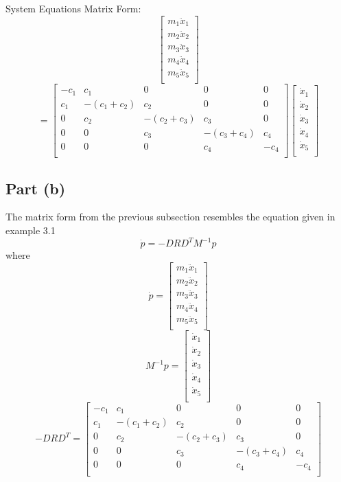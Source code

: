 \documentclass[conference]{IEEEtran}
\begin{document}
System Equations Matrix Form:
\[
\begin{bmatrix}
    m_1\ddot x_1\\
    m_2\ddot x_2\\
    m_3\ddot x_3\\
    m_4\ddot x_4\\
    m_5\ddot x_5\\
\end{bmatrix}
\]
\[
=
\begin{bmatrix}
    -c_1 & c_1 & 0 & 0 & 0\\
    c_1 & -(c_1+c_2) & c_2 & 0 & 0\\
    0 & c_2 & -(c_2+c_3) & c_3 & 0\\
    0 & 0 & c_3 & -(c_3+c_4) & c_4\\
    0 & 0 & 0 & c_4 & -c_4\\
\end{bmatrix}
\begin{bmatrix}
    \dot x_1\\
    \dot x_2\\
    \dot x_3\\
    \dot x_4\\
    \dot x_5\\
\end{bmatrix}
\]
\subsection{Part (b)}
The matrix form from the previous subsection resembles the equation given in example 3.1
\[\dot p = -DR{D^T}{M^{-1}}p\]
where 
\[\dot p = 
\begin{bmatrix}
    m_1\ddot x_1\\
    m_2\ddot x_2\\
    m_3\ddot x_3\\
    m_4\ddot x_4\\
    m_5\ddot x_5\\
\end{bmatrix}
\]
\[M^{-1}p = 
\begin{bmatrix}
    \dot x_1\\
    \dot x_2\\
    \dot x_3\\
    \dot x_4\\
    \dot x_5\\
\end{bmatrix}
\]
\[ -DR{D^T} = 
\begin{bmatrix}
    -c_1 & c_1 & 0 & 0 & 0\\
    c_1 & -(c_1+c_2) & c_2 & 0 & 0\\
    0 & c_2 & -(c_2+c_3) & c_3 & 0\\
    0 & 0 & c_3 & -(c_3+c_4) & c_4\\
    0 & 0 & 0 & c_4 & -c_4\\
\end{bmatrix}
\]
\end{document}
